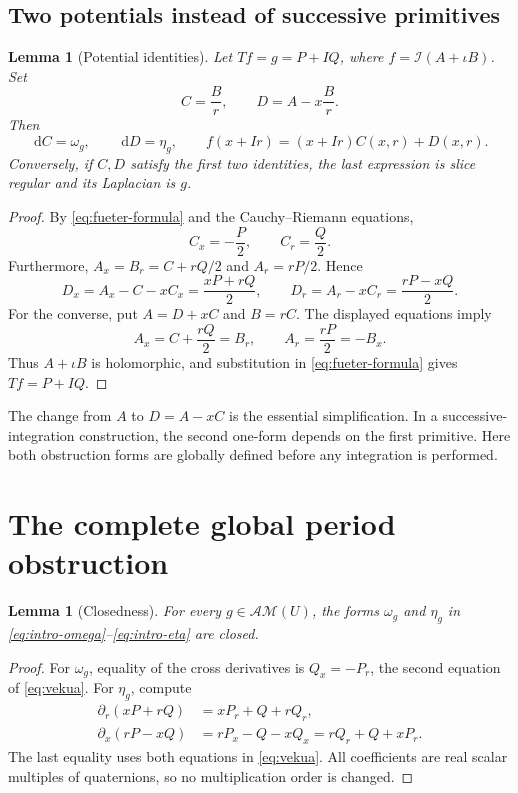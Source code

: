 \documentclass[11pt,a4paper]{article}
\numberwithin{equation}{section}
\newtheorem{lemma}[theorem]{Lemma}
\theoremstyle{definition}
\theoremstyle{remark}
\newcommand{\ic}{\iota}
\newcommand{\AM}{\mathcal{AM}}
\newcommand{\dd}{\,\mathrm d}
\newcommand{\cI}{\mathcal I}
\begin{document}
\subsection{Two potentials instead of successive primitives}
\begin{lemma}[Potential identities]\label{lem:potentials}
Let $Tf=g=P+I Q$, where $f=\cI(A+\ic B)$. Set
\begin{equation}
 C=\frac Br,\qquad D=A-x\frac Br.
 \label{eq:potentials}
\end{equation}
Then
\begin{equation}
 \dd C=\omega_g,\qquad \dd D=\eta_g,
 \qquad f(x+Ir)=(x+Ir)C(x,r)+D(x,r).
 \label{eq:potential-identities}
\end{equation}
Conversely, if $C,D$ satisfy the first two identities, the last expression
is slice regular and its Laplacian is $g$.
\end{lemma}
\begin{proof}
By \eqref{eq:fueter-formula} and the Cauchy--Riemann equations,
\[
 C_x=-\frac P2,\qquad C_r=\frac Q2.
\]
Furthermore, $A_x=B_r=C+rQ/2$ and $A_r=rP/2$. Hence
\[
 D_x=A_x-C-xC_x=\frac{xP+rQ}{2},\qquad
 D_r=A_r-xC_r=\frac{rP-xQ}{2}.
\]
For the converse, put $A=D+xC$ and $B=rC$. The displayed equations imply
\[
 A_x=C+\frac{rQ}{2}=B_r,\qquad A_r=\frac{rP}{2}=-B_x.
\]
Thus $A+\ic B$ is holomorphic, and substitution in
\eqref{eq:fueter-formula} gives $Tf=P+I Q$.
\end{proof}

The change from $A$ to $D=A-xC$ is the essential simplification. In a
successive-integration construction, the second one-form depends on the first
primitive. Here both obstruction forms are globally defined before any
integration is performed.

\section{The complete global period obstruction}
\label{sec:periods}

\begin{lemma}[Closedness]\label{lem:closed}
For every $g\in\AM(U)$, the forms $\omega_g$ and $\eta_g$ in
\eqref{eq:intro-omega}--\eqref{eq:intro-eta} are closed.
\end{lemma}
\begin{proof}
For $\omega_g$, equality of the cross derivatives is
$Q_x=-P_r$, the second equation of \eqref{eq:vekua}. For $\eta_g$, compute
\begin{align*}
 \partial_r(xP+rQ)&=xP_r+Q+rQ_r,\\
 \partial_x(rP-xQ)&=rP_x-Q-xQ_x
 =rQ_r+Q+xP_r.
\end{align*}
The last equality uses both equations in \eqref{eq:vekua}. All coefficients
are real scalar multiples of quaternions, so no multiplication order is
changed.
\end{proof}
\end{document}
